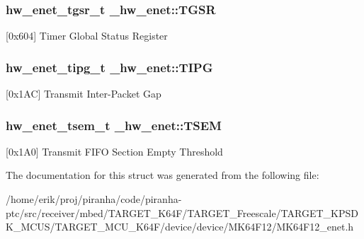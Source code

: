 \subsubsection[{\texorpdfstring{T\+G\+SR}{TGSR}}]{ {\bf hw\+\_\+enet\+\_\+tgsr\+\_\+t} \+\_\+hw\+\_\+enet\+::\+T\+G\+SR}\hypertarget{struct__hw__enet_a407cbcb633ea73b323fecc56f08ae948}{}\label{struct__hw__enet_a407cbcb633ea73b323fecc56f08ae948}
\mbox{[}0x604\mbox{]} Timer Global Status Register 
\subsubsection[{\texorpdfstring{T\+I\+PG}{TIPG}}]{ {\bf hw\+\_\+enet\+\_\+tipg\+\_\+t} \+\_\+hw\+\_\+enet\+::\+T\+I\+PG}\hypertarget{struct__hw__enet_a287676bff5c1d59fe709e80c3a6b1175}{}\label{struct__hw__enet_a287676bff5c1d59fe709e80c3a6b1175}
\mbox{[}0x1\+AC\mbox{]} Transmit Inter-\/\+Packet Gap 
\subsubsection[{\texorpdfstring{T\+S\+EM}{TSEM}}]{ {\bf hw\+\_\+enet\+\_\+tsem\+\_\+t} \+\_\+hw\+\_\+enet\+::\+T\+S\+EM}\hypertarget{struct__hw__enet_a25fa9a6dd7f944a119dbb63f7d51567d}{}\label{struct__hw__enet_a25fa9a6dd7f944a119dbb63f7d51567d}
\mbox{[}0x1\+A0\mbox{]} Transmit F\+I\+FO Section Empty Threshold 

The documentation for this struct was generated from the following file\+:\begin{DoxyCompactItemize}
\item 
/home/erik/proj/piranha/code/piranha-\/ptc/src/receiver/mbed/\+T\+A\+R\+G\+E\+T\+\_\+\+K64\+F/\+T\+A\+R\+G\+E\+T\+\_\+\+Freescale/\+T\+A\+R\+G\+E\+T\+\_\+\+K\+P\+S\+D\+K\+\_\+\+M\+C\+U\+S/\+T\+A\+R\+G\+E\+T\+\_\+\+M\+C\+U\+\_\+\+K64\+F/device/device/\+M\+K64\+F12/M\+K64\+F12\+\_\+enet.\+h\end{DoxyCompactItemize}

